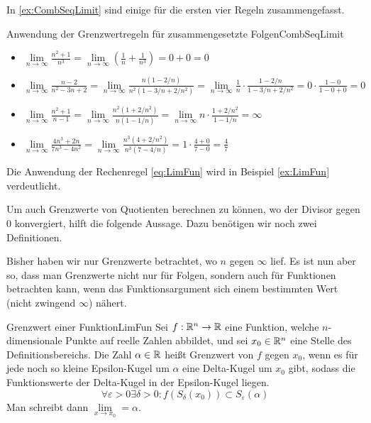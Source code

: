 In \ref{ex:CombSeqLimit} sind einige für die ersten vier Regeln zusammengefasst.

\begin{example}{Anwendung der Grenzwertregeln für zusammengesetzte Folgen}{CombSeqLimit}
    \begin{itemize}
        \item $\lim\limits_{n\to\infty} \frac{n^2+1}{n^3} = \lim\limits_{n\to\infty} \left(\frac{1}{n} + \frac{1}{n^3}\right) = 0 + 0 = 0$ \\
        \item $\lim\limits_{n\to\infty} \frac{n-2}{n^2-3n+2} = \lim\limits_{n\to\infty} \frac{n(1-2/n)}{n^2(1-3/n+2/n^2)} = \lim\limits_{n\to\infty} \frac{1}{n} \cdot \frac{1-2/n}{1-3/n+2/n^2} = 0 \cdot \frac{1-0}{1-0+0} = 0$ \\
        \item $\lim\limits_{n\to\infty} \frac{n^2+1}{n-1} = \lim\limits_{n\to\infty} \frac{n^2(1+2/n^2)}{n(1-1/n)} = \lim\limits_{n\to\infty} n \cdot \frac{1+2/n^2}{1-1/n} = \infty $
        \item $\lim\limits_{n\to\infty} \frac{4n^3+2n}{7n^3-4n^2} = \lim\limits_{n\to\infty} \frac{n^3(4+2/n^2)}{n^3(7-4/n)} = 1 \cdot \frac{4+0}{7-0} = \frac{4}{7}$
    \end{itemize}
\end{example}

Die Anwendung der Rechenregel \ref{eq:LimFun} wird in Beispiel \ref{ex:LimFun} verdeutlicht.

Um auch Grenzwerte von Quotienten berechnen zu können, wo der Divisor gegen $0$ konvergiert, hilft die folgende Aussage. Dazu benötigen wir noch zwei Definitionen.

Bisher haben wir nur Grenzwerte betrachtet, wo $n$ gegen $\infty$ lief. Es ist nun aber so, dass man Grenzwerte nicht nur für Folgen, sondern auch für Funktionen betrachten kann, wenn das Funktionsargument sich einem bestimmten Wert (nicht zwingend $\infty$) nähert.

\begin{definition}{Grenzwert einer Funktion}{LimFun}
    Sei $f: \mathbb{R}^n \to \mathbb{R}$ eine Funktion, welche $n$-dimensionale Punkte auf reelle Zahlen abbildet, und sei $x_0\in\mathbb{R}^n$ eine Stelle des Definitionsbereichs. Die Zahl $\alpha\in\mathbb{R}$ heißt Grenzwert von $f$ gegen $x_0$, wenn es für jede noch so kleine Epsilon-Kugel um $\alpha$ eine Delta-Kugel um $x_0$ gibt, sodass die Funktionswerte der Delta-Kugel in der Epsilon-Kugel liegen.
    $$
        \forall \varepsilon > 0 \exists \delta > 0 : f(S_\delta(x_0)) \subset S_\varepsilon(\alpha)
    $$
    Man schreibt dann $\lim\limits_{x\to x_0} = \alpha$.
\end{definition}

